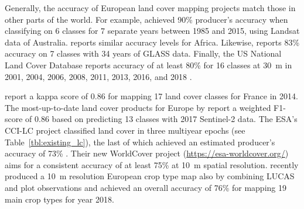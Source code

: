 Generally, the accuracy of European land cover mapping projects match those in other parts of the world. For example, \citet{calderon2021high} achieved 90\% producer's accuracy when classifying on 6 classes for 7 separate years between 1985 and 2015, using Landsat data of Australia. \citet{tsendbazar2018developing} reports similar accuracy levels for Africa. Likewise, \citet{liu2020annual} reports 83\% accuracy on 7 classes with 34 years of GLASS data. Finally, the US National Land Cover Database reports accuracy of at least 80\% for 16 classes at 30~m in 2001, 2004, 2006, 2008, 2011, 2013, 2016, and 2018 \citep{homer2020conterminous}.
    
\citet{inglada2017operational} report a kappa score of 0.86 for mapping 17 land cover classes for France in 2014. The most-up-to-date land cover products for Europe by \citet{malinowski2020} report a weighted F1-score of 0.86 based on predicting 13 classes with 2017 Sentinel-2 data. The ESA's CCI-LC project classified land cover in three multiyear epochs (see Table\@~\ref{tbl:existing_lc}), the last of which achieved an estimated producer's accuracy of 73\% \citep{arino2012global}. Their new WorldCover project (\url{https://esa-worldcover.org/}) aims for a consistent accuracy of at least 75\% at 10~m spatial resolution. \citet{dandrimont2021lucas} recently produced a 10~m resolution European crop type map also by combining LUCAS and plot observations and achieved an overall accuracy of 76\% for mapping 19 main crop types for year 2018.
    
